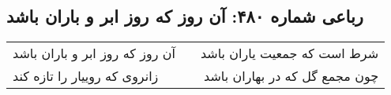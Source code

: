 \begin{center}
\section*{رباعی شماره ۴۸۰: آن روز که روز ابر و باران باشد}
\label{sec:0480}
\begin{longtable}{l p{0.5cm} r}
آن روز که روز ابر و باران باشد
&&
شرط است که جمعیت یاران باشد
\\
زانروی که روییار را تازه کند
&&
چون مجمع گل که در بهاران باشد
\\
\end{longtable}
\end{center}
